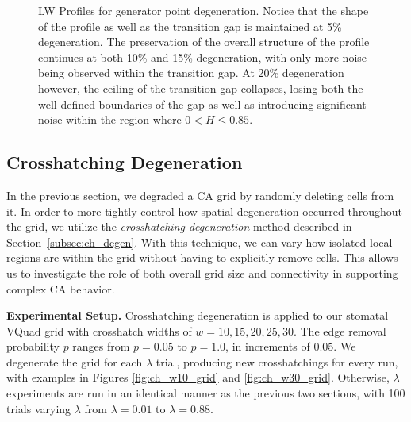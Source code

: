 \documentclass[a4paper,11pt]{article}
\begin{document}
\begin{figure}[htp]
\caption[Langton-Wootters Profile for Generator Point Degeneration]{
  LW Profiles for generator point degeneration. Notice that the shape of the profile as well as the transition gap is maintained at 5\% degeneration. The preservation of the overall structure of the profile continues at both 10\% and 15\% degeneration, with only more noise being observed within the transition gap. At 20\% degeneration however, the ceiling of the transition gap collapses, losing both the well-defined boundaries of the gap as well as introducing significant noise within the region where $0 < H \le 0.85$.
}
\label{fig:lw_gen_pt_degen}
\end{figure}

\subsection{Crosshatching Degeneration}

In the previous section, we degraded a CA grid by randomly deleting cells from it. In order to more tightly control how spatial degeneration occurred throughout the grid, we utilize the \textit{crosshatching degeneration} method described in Section~\ref{subsec:ch_degen}. With this technique, we can vary how isolated local regions are within the grid without having to explicitly remove cells. This allows us to investigate the role of both overall grid size and connectivity in supporting complex CA behavior.

\medskip

\noindent \textbf{Experimental Setup.} Crosshatching degeneration is applied to our stomatal VQuad grid with crosshatch widths of $w=10,15,20,25,30$. The edge removal probability $p$ ranges from $p=0.05$ to $p=1.0$, in increments of $0.05$. We degenerate the grid for each $\lambda$ trial, producing new crosshatchings for every run, with examples in Figures \ref{fig:ch_w10_grid} and \ref{fig:ch_w30_grid}. Otherwise, $\lambda$ experiments are run in an identical manner as the previous two sections, with 100 trials varying $\lambda$ from $\lambda=0.01$ to $\lambda=0.88$.
\end{document}
